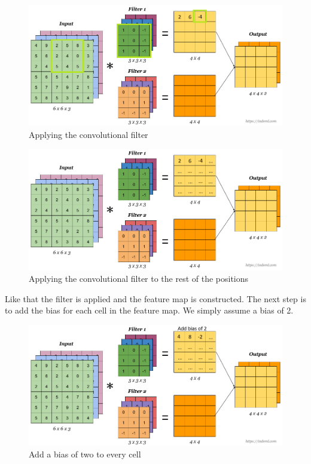 \documentclass[a4paper,12pt]{report}
\begin{document}
\begin{figure}[htbp]
  \centering
  \includegraphics[width=\textwidth]{images/CNN_filters_2.png}
  \caption{Applying the convolutional filter}
  \label{fig:fullwidth}
\end{figure}

\begin{figure}[htbp]
  \centering
  \includegraphics[width=\textwidth]{images/CNN_filters_3.png}
  \caption{Applying the convolutional filter to the rest of the positions}
  \label{fig:fullwidth}
\end{figure}
\FloatBarrier
Like that the filter is applied and the feature map is constructed. The next step is to add the bias for each cell in the feature map. We simply assume a bias of 2.

\begin{figure}[htbp]
  \centering
  \includegraphics[width=\textwidth]{images/CNN_filters_3_5.png}
  \caption{Add a bias of two to every cell}
  \label{fig:fullwidth}
\end{figure}
\end{document}
